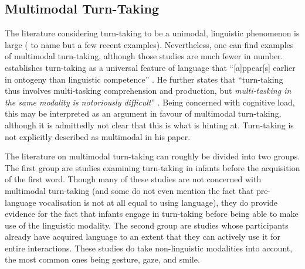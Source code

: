 \subsection{Multimodal Turn-Taking}
\label{ssec:introrestt}
The literature considering turn-taking to be a unimodal, linguistic phenomenon is large (\citet{casillas_turn-taking_2016,freud_turn-taking_2016,heldner_pauses_2010,kurtic_resources_2013} to name but a few recent examples).
Nevertheless, one can find examples of multimodal turn-taking, although those studies are much fewer in number.
\citet{levinson_turn-taking_2016} establishes turn-taking as a universal feature of language that ``[a]ppear[s] earlier in ontogeny than linguistic competence'' \citep[]{levinson_turn-taking_2016}.
He further states that ``turn-taking thus involves multi-tasking comprehension and production, but \emph{multi-tasking in the same modality is notoriously difficult}'' \citep[, emphasis mine]{levinson_turn-taking_2016}.
Being concerned with cognitive load, this may be interpreted as an argument in favour of multimodal turn-taking, although it is admittedly not clear that this is what \citeauthor{levinson_turn-taking_2016} is hinting at.
Turn-taking is not explicitly described as multimodal in his paper.

The literature on multimodal turn-taking can roughly be divided into two groups.
The first group are studies examining turn-taking in infants before the acquisition of the first word.
Though many of these studies are not concerned with multimodal turn-taking (and some do not even mention the fact that pre-language vocalisation is not at all equal to using language), they do provide evidence for the fact that infants engage in turn-taking before being able to make use of the linguistic modality.
The second group are studies whose participants already have acquired language to an extent that they can actively use it for entire interactions.
These studies do take non-linguistic modalities into account, the most common ones being gesture, gaze, and smile. %

